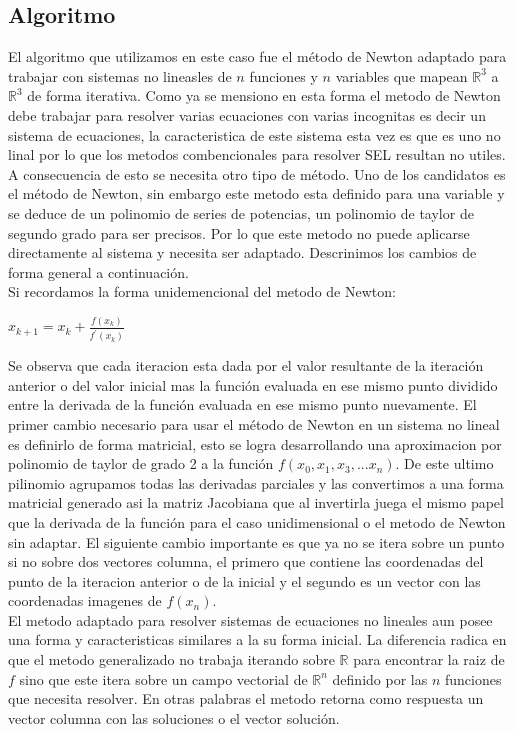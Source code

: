 \documentclass[11pt]{article}
\begin{document}
\subsection{Algoritmo}
El algoritmo que utilizamos en este caso fue el  método de Newton adaptado para trabajar con sistemas no lineasles de $n$ funciones y $n$ variables que mapean $\mathbb{R}^3$ a $\mathbb{R}^3$ de forma iterativa. Como ya se mensiono en esta forma el metodo de Newton debe trabajar para resolver varias ecuaciones con varias incognitas es decir un sistema de ecuaciones, la caracteristica de este sistema esta vez es que es uno no linal por lo que los metodos combencionales para resolver SEL resultan no utiles. A consecuencia de esto se necesita otro tipo de método. Uno de los candidatos es el método de Newton, sin embargo este metodo esta definido para una variable y se deduce de un polinomio de series de potencias, un polinomio de taylor de segundo grado para ser precisos. Por lo que este metodo no puede aplicarse directamente al sistema y  necesita ser adaptado. Descrinimos los cambios de forma general a continuación.\\

Si recordamos la forma unidemencional del metodo de Newton:\\
\begin{center}
$x_{k+1} = x_{k} + \frac{f(x_{k})}{f^\prime(x_{k})} \label{eq:1}$\\
\end{center}

Se observa que cada iteracion esta dada por el valor resultante de la iteración anterior o del valor inicial mas la función evaluada en ese mismo punto dividido entre la derivada de la función evaluada en ese mismo punto nuevamente. El primer cambio necesario para usar el método de Newton en un sistema no lineal es definirlo de forma matricial, esto se logra desarrollando una aproximacion por polinomio de taylor de grado 2 a la función $f(x_{0},x_{1},x_{3},...x_{n})$. De este ultimo pilinomio agrupamos todas las derivadas parciales y las convertimos a una forma matricial generado asi la matriz Jacobiana que al invertirla  juega el mismo papel que la derivada de la función para el caso unidimensional o el metodo de Newton sin adaptar. El siguiente cambio importante es que ya no se itera sobre un punto si no sobre dos vectores columna, el primero que contiene las coordenadas del punto de la iteracion anterior o de la inicial y el segundo es un vector con las coordenadas imagenes de $f(x_{n})$.\\
El metodo adaptado para resolver sistemas de ecuaciones no lineales aun posee una forma y caracteristicas similares a la su forma inicial. La diferencia radica en que el metodo generalizado no trabaja iterando sobre $\mathbb{R}$ para encontrar la raiz de $f$ sino que este itera sobre un campo vectorial de $\mathbb{R}^n$ definido por las $n$ funciones que necesita resolver. En otras palabras el metodo retorna como respuesta un vector columna con las soluciones o el vector solución.\\
\end{document}
